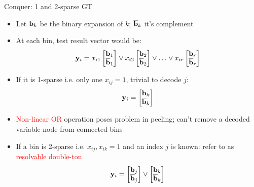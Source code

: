 \documentclass[final]{beamer}
\newlength{\threecolwid}
\newlength{\negativeskip}
\begin{document}
\begin{frame}
\begin{columns}[t]
  \begin{column}{\threecolwid}
      \vspace{\negativeskip}
    \begin{block}{\Large Conquer: 1 and 2-sparse GT}
	    \begin{itemize}
 	        \item Let $\mathbf{b}_k$ be the binary expansion of $k$; $\overline{\mathbf{b}}_k$ it's complement
    		\item At each bin, test result vector would be:
		    	\begin{equation*}
				    \mathbf{y}_i=x_{i1}\begin{bmatrix}
				    \mathbf{b}_1\\
				    \overline{\mathbf{b}}_1
				    \end{bmatrix}  \lor x_{i2}\begin{bmatrix}
				    \mathbf{b}_2\\
				    \overline{\mathbf{b}}_2
				    \end{bmatrix}\lor \ldots \lor x_{ir}\begin{bmatrix}
				    \mathbf{b}_r\\
				    \overline{\mathbf{b}}_r
				    \end{bmatrix}
			    \end{equation*}
    		\item If it is 1-sparse i.e. only one $x_{ij}=1$, trivial to decode $j$:
		        \begin{equation*}
				    \mathbf{y}_i=\begin{bmatrix}
				    \mathbf{b}_k\\
				    \overline{\mathbf{b}}_k
				    \end{bmatrix}
		        \end{equation*}
			\item \textcolor{red}{Non-linear OR} operation poses problem in peeling; can't remove a decoded variable node from connected bins
			\item If a bin is 2-sparse i.e. $x_{ij}, x_{ik}=1$ and an index $j$ is known: refer to as \textcolor{red}{resolvable double-ton}
		        \begin{equation*}
				    \mathbf{y}_i=\begin{bmatrix}
				    \mathbf{b}_j\\
				    \overline{\mathbf{b}}_j
				    \end{bmatrix} \lor \begin{bmatrix}
				    \mathbf{b}_k\\
				    \overline{\mathbf{b}}_k

\end{bmatrix}
\end{equation*}
\end{itemize}
\end{block}
\end{column}
\end{columns}
\end{frame}
\end{document}
